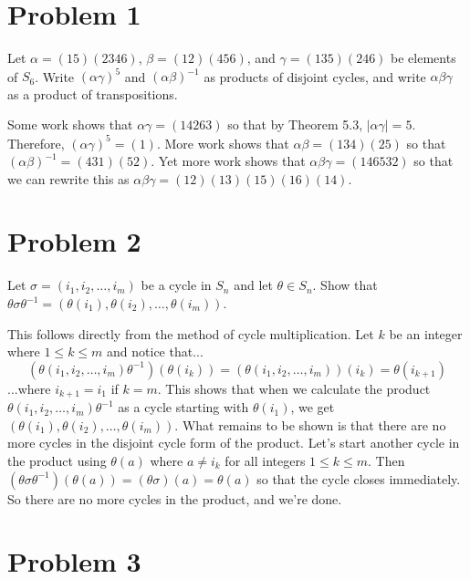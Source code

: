 \documentclass{article}
\begin{document}
\newcommand{\aut}{\mbox{Aut}}
\newcommand{\Z}{\mathbb{Z}}
\newcommand{\lcm}{\mbox{lcm}}

\section*{Problem 1}

Let $\alpha=(15)(2346)$, $\beta=(12)(456)$, and
$\gamma=(135)(246)$ be elements of $S_6$.  Write
$(\alpha\gamma)^5$ and $(\alpha\beta)^{-1}$ as products of
disjoint cycles, and write $\alpha\beta\gamma$ as a product
of transpositions.

Some work shows that $\alpha\gamma=(14263)$ so that by Theorem 5.3,
$|\alpha\gamma|=5$.  Therefore, $(\alpha\gamma)^5=(1)$.
More work shows that $\alpha\beta=(134)(25)$ so that
$(\alpha\beta)^{-1}=(431)(52)$.  Yet more work shows that
$\alpha\beta\gamma=(146532)$ so that we can rewrite this
as $\alpha\beta\gamma=(12)(13)(15)(16)(14)$.

\section*{Problem 2}

Let $\sigma=(i_1,i_2,\dots,i_m)$ be a cycle in $S_n$ and let
$\theta\in S_n$.  Show that
$\theta\sigma\theta^{-1} = (\theta(i_1),\theta(i_2),\dots,\theta(i_m))$.

This follows directly from the method of cycle multiplication.
Let $k$ be an integer where $1\leq k\leq m$ and notice that...
\begin{equation*}
(\theta(i_1,i_2,\dots,i_m)\theta^{-1})(\theta(i_k))
 = (\theta(i_1,i_2,\dots,i_m))(i_k)
 = \theta(i_{k+1})
\end{equation*}
...where $i_{k+1}=i_1$ if $k=m$.
This shows that when we calculate the product
$\theta(i_1,i_2,\dots,i_m)\theta^{-1}$ as a cycle starting
with $\theta(i_1)$, we get $(\theta(i_1),\theta(i_2),\dots,\theta(i_m))$.
What remains to be shown is that there are no more cycles in the disjoint
cycle form of the product.  Let's start another cycle in the product
using $\theta(a)$ where $a\neq i_k$ for all integers $1\leq k\leq m$.
Then $(\theta\sigma\theta^{-1})(\theta(a))=(\theta\sigma)(a)=\theta(a)$
so that the cycle closes immediately.  So there are no more cycles
in the product, and we're done.

\section*{Problem 3}
\end{document}
